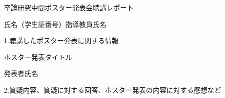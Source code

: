\documentclass[a4paper,12pt]{article}
\begin{document}
\begin{center}
卒論研究中間ポスター発表会聴講レポート

\vspace{3mm}

氏名（学生証番号）\quad 指導教員\quad 氏名
\end{center}

\vspace{10mm}

1.\quad 聴講したポスター発表に関する情報

\vspace{5mm}

ポスター発表タイトル

\vspace{12mm}

発表者氏名

\vspace{12mm}

2.\quad 質疑内容、質疑に対する回答、ポスター発表の内容に対する感想など
\end{document}
